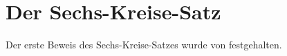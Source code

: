 
\chapter{Der Sechs-Kreise-Satz}
\label{six-circle-theorem}

Der erste Beweis des Sechs-Kreise-Satzes wurde von \citet{EMT1974} festgehalten.
